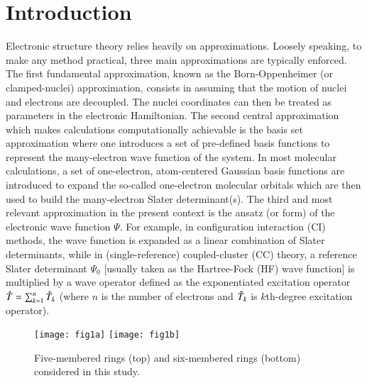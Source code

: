 \documentclass[aip,jcp,reprint,noshowkeys,superscriptaddress,floatfix]{revtex4-1}
\newcommand{\Nel}{n}
\newcommand{\hT}{\Hat{T}}
\newcommand{\PsiO}{\Psi_0}
\begin{document}
\maketitle

\section{Introduction}
\label{sec:intro}
Electronic structure theory relies heavily on approximations. \cite{Szabo_1996,Helgaker_2013,Jensen_2017}  
Loosely speaking, to make any method practical, three main approximations are typically enforced.
The first fundamental approximation, known as the Born-Oppenheimer (or clamped-nuclei) approximation, consists in assuming that the motion of nuclei and electrons are decoupled. \cite{Born_1927}
The nuclei coordinates can then be treated as parameters in the electronic Hamiltonian.
The second central approximation which makes calculations computationally achievable is the basis set approximation where one introduces a set of pre-defined basis functions to represent the many-electron wave function of the system.
In most molecular calculations, a set of one-electron, atom-centered Gaussian basis functions are introduced to expand the so-called one-electron molecular orbitals which are then used to build the many-electron Slater determinant(s).
The third and most relevant approximation in the present context is the ansatz (or form) of the electronic wave function $\Psi$.
For example, in configuration interaction (CI) methods, the wave function is expanded as a linear combination of Slater determinants, while in (single-reference) coupled-cluster (CC) theory, \cite{Cizek_1966,Paldus_1972,Crawford_2000,Piecuch_2002b,Bartlett_2007,Shavitt_2009} a reference Slater determinant $\PsiO$ [usually taken as the Hartree-Fock (HF) wave function] is multiplied by a wave operator defined as the exponentiated excitation operator $\hT = \sum_{k=1}^\Nel \hT_k$ (where $\Nel$ is the number of electrons and $\hT_k$ is $k$th-degree excitation operator).

\begin{figure*}
	\texttt{[image: fig1a]}
	\texttt{[image: fig1b]}
	\caption{
	Five-membered rings (top) and six-membered rings (bottom) considered in this study.
	\label{fig:mol}}
\end{figure*}
\end{document}

